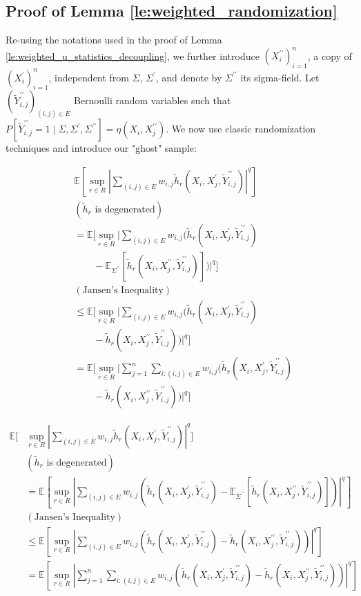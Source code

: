 \documentclass[letterpaper]{article} %
\def\DoubleColumn{}
\def\DoubleColumnEnd{}
\def\SingleColumn{}
\newcommand{\E}{\mathbb{E}}
\newcommand{\Pro}{P}
\newcommand{\pair}[1]{(#1)}
\begin{document}
\subsection{Proof of Lemma \ref{le:weighted_randomization}} %
\label{sub:proof_of_lemma_le:weighted_randomization}

    Re-using the notations used in the proof of Lemma \ref{le:weighted_u_statistics_decoupling}, we further introduce $(X_i^{\prime\prime})_{i=1}^n$, a copy of $(X_i^\prime)_{i=1}^n$, independent from $\Sigma$, $\Sigma^\prime$, and denote by $\Sigma^{\prime\prime}$ its sigma-field. Let $(\tilde{Y}_{i,j}^{\prime\prime})_{(i,j)\in E}$ Bernoulli random variables such that $\Pro[\tilde{Y}_{i,j}^{\prime\prime}=1\mid \Sigma,\Sigma^\prime,\Sigma^{\prime\prime}]=\eta(X_i,X_j^{\prime\prime})$. We now use classic randomization techniques and introduce our "ghost" sample:
    \DoubleColumn
\begin{align*}
    &\E[\sup_{r\in R}|\sum_{\pair{i,j}\in E} w_{i,j}\tilde{h}_r(X_i,X_j^\prime,\tilde{Y}_{i,j}^{\prime\prime})|^q]\\
    &(\tilde{h}_r \text{ is degenerated})\\
    &= \E[\sup_{r\in R}|\sum_{\pair{i,j}\in E} w_{i,j}(\tilde{h}_r(X_i,X_j^\prime,\tilde{Y}_{i,j}^{\prime\prime})\\
    &\qquad-\E_{\Sigma^{\prime\prime}}[\tilde{h}_r(X_i,X_j^{\prime\prime},\tilde{Y}_{i,j}^{\prime\prime})])|^q]\\
    &(\text{Jansen's Inequality})\\
    &\le \E[\sup_{r\in R}|\sum_{\pair{i,j}\in E} w_{i,j}(\tilde{h}_r(X_i,X_j^\prime,\tilde{Y}_{i,j}^{\prime\prime})\\
    &\qquad-\tilde{h}_r(X_i,X_j^{\prime\prime},\tilde{Y}_{i,j}^{\prime\prime}))|^q]\\
    &= \E[\sup_{r\in R}|\sum_{j=1}^n \sum_{i:\pair{i,j}\in E} w_{i,j}(\tilde{h}_r(X_i,X_j^\prime,\tilde{Y}_{i,j}^{\prime\prime})\\
    &\qquad-\tilde{h}_r(X_i,X_j^{\prime\prime},\tilde{Y}_{i,j}^{\prime\prime}))|^q]
\end{align*}
\DoubleColumnEnd
    \SingleColumn
\begin{align*}
    \E[&\sup_{r\in R}|\sum_{\pair{i,j}\in E} w_{i,j}\tilde{h}_r(X_i,X_j^\prime,\tilde{Y}_{i,j}^{\prime\prime})|^q]\\
    &(\tilde{h}_r \text{ is degenerated})\\
    &= \E[\sup_{r\in R}|\sum_{\pair{i,j}\in E} w_{i,j}(\tilde{h}_r(X_i,X_j^\prime,\tilde{Y}_{i,j}^{\prime\prime})-\E_{\Sigma^{\prime\prime}}[\tilde{h}_r(X_i,X_j^{\prime\prime},\tilde{Y}_{i,j}^{\prime\prime})])|^q]\\
    &(\text{Jansen's Inequality})\\
    &\le \E[\sup_{r\in R}|\sum_{\pair{i,j}\in E} w_{i,j}(\tilde{h}_r(X_i,X_j^\prime,\tilde{Y}_{i,j}^{\prime\prime})-\tilde{h}_r(X_i,X_j^{\prime\prime},\tilde{Y}_{i,j}^{\prime\prime}))|^q]\\
    &= \E[\sup_{r\in R}|\sum_{j=1}^n \sum_{i:\pair{i,j}\in E} w_{i,j}(\tilde{h}_r(X_i,X_j^\prime,\tilde{Y}_{i,j}^{\prime\prime})-\tilde{h}_r(X_i,X_j^{\prime\prime},\tilde{Y}_{i,j}^{\prime\prime}))|^q]
\end{align*}
\end{document}
